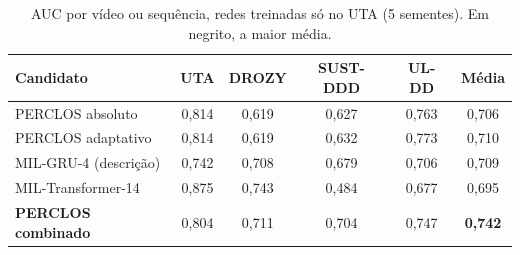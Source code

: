 \documentclass[11pt,a4paper]{article}
\newcommand{\auc}{AUC}
\begin{document}
\begin{table}[!t]
\centering\small
\caption{\auc{} por vídeo ou sequência, redes treinadas só no UTA (5 sementes). Em negrito, a maior média.}
\label{tab:sono}
\begin{tabular}{@{}lccccc@{}}
\toprule
Candidato & UTA & DROZY & SUST-DDD & UL-DD & Média\\
\midrule
PERCLOS absoluto & 0,814 & 0,619 & 0,627 & 0,763 & 0,706\\
PERCLOS adaptativo & 0,814 & 0,619 & 0,632 & 0,773 & 0,710\\
MIL-GRU-4 (descrição) & 0,742 & 0,708 & 0,679 & 0,706 & 0,709\\
MIL-Transformer-14 & 0,875 & 0,743 & 0,484 & 0,677 & 0,695\\
\textbf{PERCLOS combinado} & 0,804 & 0,711 & 0,704 & 0,747 & \textbf{0,742}\\
\bottomrule
\end{tabular}
\end{table}
\end{document}
